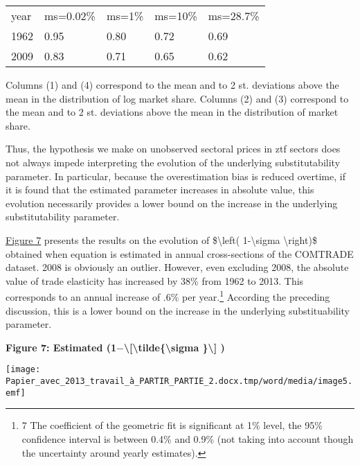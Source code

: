 \documentclass[12pt,twoside,a4paper,notitlepage]{article}
\begin{document}
\begin{table}
\begin{tabularx}{\textwidth}{
p{}
p{}
p{}
p{}
p{}}
year & ms=0.02\% & ms=1\% & ms=10\% & ms=28.7\% \\
1962 & 0.95 & 0.80 & 0.72 & 0.69 \\
2009 & 0.83 & 0.71 & 0.65 & 0.62 \\

\end{tabularx}

\end{table}

Columns (1) and (4) correspond to the mean and to 2 st. deviations above the mean in the distribution of log market share. Columns (2) and (3) correspond to the mean and to 2 st. deviations above the mean in the distribution of market share. 

Thus, the hypothesis we make on unobserved sectoral prices in ztf sectors does not always impede interpreting the evolution of the underlying substitutability parameter. In particular, because the overestimation bias is reduced overtime, if it is found that the estimated parameter increases in absolute value, this evolution necessarily provides a lower bound on the increase in the underlying substitutability parameter.

{\hyperref[ref-007]{Figure 7}} presents the results on the evolution of \$\textbackslash left( 1-\textbackslash sigma \textbackslash right)\$ obtained when equation {\hyperref[ref-002]{ }} is estimated in annual cross-sections of the COMTRADE dataset. 2008 is obviously an outlier. However, even excluding 2008, the absolute value of trade elasticity has increased by 38\% from 1962 to 2013. This corresponds to an annual increase of .6\% per year.\footnote{7 The coefficient of the geometric fit is significant at 1\% level, the 95\% confidence interval is between 0.4\% and 0.9\% (not taking into account though the uncertainty around yearly estimates).
} According the preceding discussion, this is a lower bound on the increase in the underlying substituability parameter. 

\textbf{Figure 7: Estimated (1${-}$\textbackslash [\textbackslash tilde\{\textbackslash sigma \}\textbackslash ] )\label{ref-007}}

\texttt{[image: Papier\_avec\_2013\_travail\_à\_PARTIR\_PARTIE\_2.docx.tmp/word/media/image5.emf]} 
\end{document}
